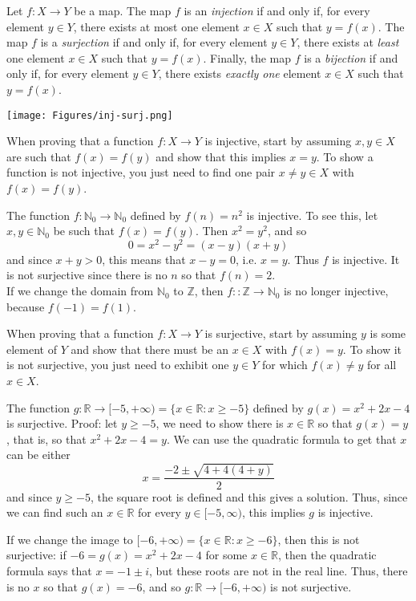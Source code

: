 \documentclass[11pt,dvipsnames]{book}
\numberwithin{figure}{section} %
\numberwithin{table}{section} %
\begin{document}
Let $f \colon X \to Y$ be a map.
The map $f$ is an \emph{injection} if and only if, for every element $y \in Y$, there exists at most one element $x \in X$ such that $y =f(x)$.
The map $f$ is a \emph{surjection} if and only if, for every element $y \in Y$, there exists at \emph{least} one element $x \in X$ such that $y = f(x)$.
Finally, the map $f$ is a \emph{bijection} if and only if, for every element $y\in Y$, there exists \emph{exactly one} element $x \in X $ such that $y = f(x)$.

\begin{center}
\texttt{[image: Figures/inj-surj.png]}
\end{center}

\begin{protip}
When proving that a function $f:X\rightarrow Y$ is injective, start by assuming $x,y\in X$ are such that $f(x)=f(y)$ and show that this implies $x=y$. To show a function is not injective, you just need to find one pair $x\neq y\in X$ with $f(x)=f(y)$.
\end{protip}

\begin{example}
The function $f\colon\mathbb{N}_0\rightarrow \mathbb{N}_0$ defined by $f(n)=n^2$ is injective. To see this, let $x,y\in\mathbb{N}_0$ be such that $f(x)=f(y)$. Then $x^2=y^2$, and so
\[
0=x^2-y^2=(x-y)(x+y)
\]
and since $x+y>0$, this means that $x-y=0$, i.e. $x=y$. Thus $f$ is injective. It is not surjective since there is no $n$ so that $f(n)=2$. \\

If we change the domain from $\mathbb{N}_0$ to $\mathbb{Z}$, then $f:\colon\mathbb{Z}\rightarrow \mathbb{N}_0$ is no longer injective, because $f(-1)=f(1)$.
\end{example}

\begin{protip}
When proving that a function $f\colon X\rightarrow Y$ is surjective, start by assuming $y$ is some element of $Y$ and show that there must be an $x\in X$ with $f(x)=y$. To show it is not surjective, you just need to exhibit one $y\in Y$ for which $f(x)\neq y$ for all $x\in X$.
\end{protip}

\begin{example}
The function $g\colon\mathbb{R}\rightarrow [-5,+\infty)=\{x\in\mathbb{R}: x\geq -5\} $ defined by $g(x)=x^2+2x-4$ is surjective. Proof: let $y\geq -5$, we need to show there is $x\in\mathbb{R}$ so that $g(x)=y$, that is, so that $x^2+2x-4=y$. We can use the quadratic formula to get that $x$ can be either
\[
x=\frac{-2\pm \sqrt{4+4(4+y)}}{2}
\]
and since $y\geq -5$, the square root is defined and this gives a solution. Thus, since we can find such an $x\in \mathbb{R}$ for every $y\in [-5,\infty)$, this implies $g$ is injective.

If we change the image to $[-6,+\infty)=\{x\in\mathbb{R} : x\geq -6\}$, then this is not surjective: if $-6=g(x)=x^2+2x-4$ for some $x\in\mathbb{R}$, then the quadratic formula says that $x=-1\pm i$, but these roots are not in the real line. Thus, there is no $x$ so that $g(x)=-6$, and so $g\colon \mathbb{R}\rightarrow [-6,+\infty)$ is not surjective.
\end{example}
\end{document}
